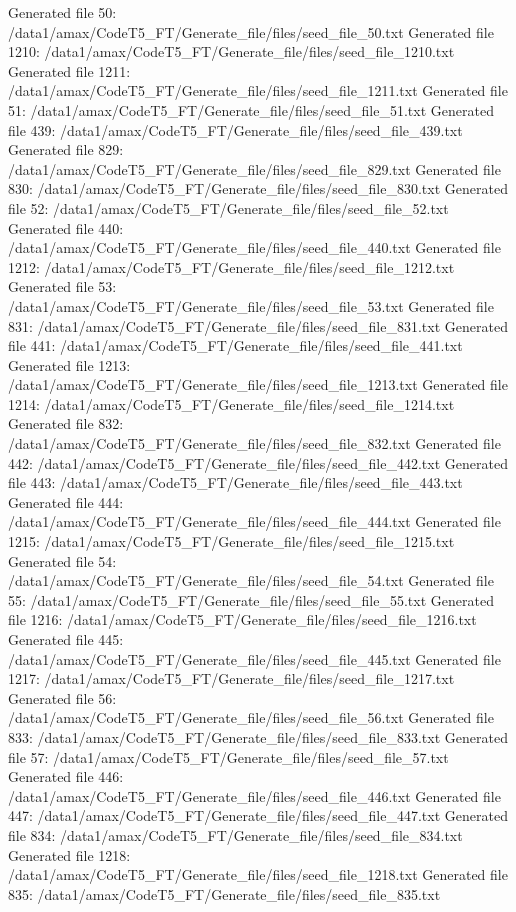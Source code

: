 Generated file 50: /data1/amax/CodeT5_FT/Generate_file/files/seed_file_50.txt
Generated file 1210: /data1/amax/CodeT5_FT/Generate_file/files/seed_file_1210.txt
Generated file 1211: /data1/amax/CodeT5_FT/Generate_file/files/seed_file_1211.txt
Generated file 51: /data1/amax/CodeT5_FT/Generate_file/files/seed_file_51.txt
Generated file 439: /data1/amax/CodeT5_FT/Generate_file/files/seed_file_439.txt
Generated file 829: /data1/amax/CodeT5_FT/Generate_file/files/seed_file_829.txt
Generated file 830: /data1/amax/CodeT5_FT/Generate_file/files/seed_file_830.txt
Generated file 52: /data1/amax/CodeT5_FT/Generate_file/files/seed_file_52.txt
Generated file 440: /data1/amax/CodeT5_FT/Generate_file/files/seed_file_440.txt
Generated file 1212: /data1/amax/CodeT5_FT/Generate_file/files/seed_file_1212.txt
Generated file 53: /data1/amax/CodeT5_FT/Generate_file/files/seed_file_53.txt
Generated file 831: /data1/amax/CodeT5_FT/Generate_file/files/seed_file_831.txt
Generated file 441: /data1/amax/CodeT5_FT/Generate_file/files/seed_file_441.txt
Generated file 1213: /data1/amax/CodeT5_FT/Generate_file/files/seed_file_1213.txt
Generated file 1214: /data1/amax/CodeT5_FT/Generate_file/files/seed_file_1214.txt
Generated file 832: /data1/amax/CodeT5_FT/Generate_file/files/seed_file_832.txt
Generated file 442: /data1/amax/CodeT5_FT/Generate_file/files/seed_file_442.txt
Generated file 443: /data1/amax/CodeT5_FT/Generate_file/files/seed_file_443.txt
Generated file 444: /data1/amax/CodeT5_FT/Generate_file/files/seed_file_444.txt
Generated file 1215: /data1/amax/CodeT5_FT/Generate_file/files/seed_file_1215.txt
Generated file 54: /data1/amax/CodeT5_FT/Generate_file/files/seed_file_54.txt
Generated file 55: /data1/amax/CodeT5_FT/Generate_file/files/seed_file_55.txt
Generated file 1216: /data1/amax/CodeT5_FT/Generate_file/files/seed_file_1216.txt
Generated file 445: /data1/amax/CodeT5_FT/Generate_file/files/seed_file_445.txt
Generated file 1217: /data1/amax/CodeT5_FT/Generate_file/files/seed_file_1217.txt
Generated file 56: /data1/amax/CodeT5_FT/Generate_file/files/seed_file_56.txt
Generated file 833: /data1/amax/CodeT5_FT/Generate_file/files/seed_file_833.txt
Generated file 57: /data1/amax/CodeT5_FT/Generate_file/files/seed_file_57.txt
Generated file 446: /data1/amax/CodeT5_FT/Generate_file/files/seed_file_446.txt
Generated file 447: /data1/amax/CodeT5_FT/Generate_file/files/seed_file_447.txt
Generated file 834: /data1/amax/CodeT5_FT/Generate_file/files/seed_file_834.txt
Generated file 1218: /data1/amax/CodeT5_FT/Generate_file/files/seed_file_1218.txt
Generated file 835: /data1/amax/CodeT5_FT/Generate_file/files/seed_file_835.txt
